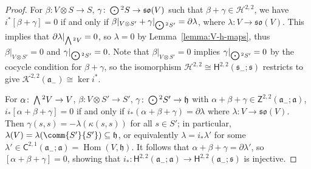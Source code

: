 \documentclass[pdftex]{sigma}
\numberwithin{equation}{section}
\newcommand{\fa}{\mathfrak{a}}
\newcommand{\fh}{\mathfrak{h}}
\newcommand{\fs}{\mathfrak{s}}
\newcommand{\fso}{\mathfrak{so}}
\newcommand{\cH}{\mathcal{H}}
\newcommand{\cK}{\mathcal{K}}
\newcommand{\ssC}{\mathsf{C}}
\newcommand{\ssH}{\mathsf{H}}
\newcommand{\ssZ}{\mathsf{Z}}
\newcommand{\Wedge}{\mathchoice{{\textstyle\bigwedge}}{\bigwedge}{\bigwedge}{\bigwedge}}	%
\newcommand{\Odot}{\mathchoice{{\textstyle\bigodot}}{\bigodot}{\bigodot}{\bigodot}}
\newcommand{\1}{\mathbbm{1}}
\DeclareMathOperator{\Hom}{Hom}
\begin{document}
\begin{proof}
	For $\beta\colon V\otimes S\to S$, $\gamma\colon \Odot^2S\to\fso(V)$ such that $\beta+\gamma\in\cH^{2,2}$, we have $i^*[\beta+\gamma]=0$ if and only if $\beta|_{V\otimes S'}+\gamma|_{\Odot^2S'}=\partial\lambda$, where $\lambda\colon V\to\fso(V)$. This implies that $\partial\lambda|_{\Wedge^2 V}=0$, so $\lambda=0$ by Lemma~\ref{lemma:V-h-maps}, thus $\beta|_{V\otimes S'}=0$ and $\gamma|_{\Odot^2S'}=0$. Note that $\beta|_{V\otimes S'}=0$ implies $\gamma|_{\Odot^2S'}=0$ by the cocycle condition for $\beta+\gamma$, so the isomorphism $\cH^{2,2}\cong\ssH^{2,2}(\fs_-;\fs)$ restricts to give $\cK^{2,2}(\fa_-)\cong \ker i^*$.
	
	For $\alpha\colon \Wedge^2V\to V$, $\beta\colon V\otimes S'\to S'$, $\gamma\colon \Odot^2S'\to\fh$ with $\alpha+\beta+\gamma\in\ssZ^{2,2}(\fa_-;\fa)$, $i_*[\alpha+\beta+\gamma]=0$ if and only if $i_*(\alpha+\beta+\gamma)=\partial\lambda$ where $\lambda:V\to\fso(V)$. Then $\gamma(s,s)=-\lambda(\kappa(s,s))$ for all $s\in S'$; in particular, $\lambda(V)=\lambda(\comm{S'}{S'})\subseteq\fh$, or equivalently $\lambda=i_*\lambda'$ for some $\lambda'\in\ssC^{2,1}(\fa_-;\fa)=\Hom(V,\fh)$. It follows that $\alpha+\beta+\gamma=\partial\lambda'$, so $[\alpha+\beta+\gamma]=0$, showing that $i_*\colon \ssH^{2,2}(\fa_-;\fa)\to \ssH^{2,2}(\fa_-;\fs)$ is injective.
\end{proof}
\end{document}
